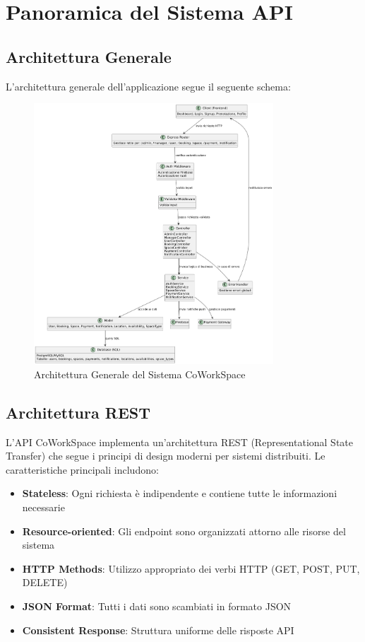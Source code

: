 \section{Panoramica del Sistema API}

\subsection{Architettura Generale}
L'architettura generale dell'applicazione segue il seguente schema:

\begin{figure}[H]
    \centering
    \includegraphics[width=0.8\textwidth]{sections/Schema_architetturale.png}
    \caption{Architettura Generale del Sistema CoWorkSpace}
\end{figure}

\subsection{Architettura REST}
L'API CoWorkSpace implementa un'architettura REST (Representational State Transfer) che segue i principi di design moderni per sistemi distribuiti. Le caratteristiche principali includono:

\begin{itemize}
    \item \textbf{Stateless}: Ogni richiesta è indipendente e contiene tutte le informazioni necessarie
    \item \textbf{Resource-oriented}: Gli endpoint sono organizzati attorno alle risorse del sistema
    \item \textbf{HTTP Methods}: Utilizzo appropriato dei verbi HTTP (GET, POST, PUT, DELETE)
    \item \textbf{JSON Format}: Tutti i dati sono scambiati in formato JSON
    \item \textbf{Consistent Response}: Struttura uniforme delle risposte API
\end{itemize}

